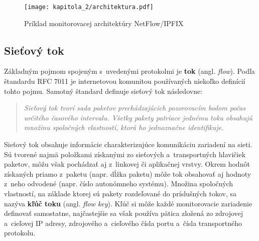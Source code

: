 \begin{figure*}[ht]
    \centering
    \texttt{[image: kapitola\_2/architektura.pdf]}
    \caption{Príklad monitorovacej architektúry NetFlow/IPFIX \cite{ipfix_architektura}}
    \label{architektura_ipfix}
\end{figure*}

\subsection*{Sieťový tok}
Základným pojmom spojeným s~uvedenými protokolmi je \textbf{tok} (angl. \textit{flow}). Podľa štandardu RFC 7011 \cite{rfc7011} je internetovou komunitou používaných niekoľko definícií tohto pojmu. Samotný štandard definuje sieťový tok následovne:

\begin{quote}
    \textit{Sieťový tok tvorí sada paketov prechádzajúcich pozorovacím bodom počas určitého časového intervalu. Všetky pakety patriace jednému toku obsahujú množinu spoločných vlastností, ktorá ho jednoznačne identifikuje.}
\end{quote}

Sieťový tok obsahuje informácie charakterizujúce komunikáciu zariadení na sieti. Sú tvorené najmä položkami získanými zo sieťových a~transportných hlavičiek paketov, môžu však pochádzať aj z~linkovej či aplikačnej vrstvy. Okrem hodnôt získaných priamo z~paketu
(napr. dĺžka paketu) môže tok obsahovať aj hodnoty z~neho odvodené (napr. číslo autonómneho systému). Množina spoločných vlastností, na základe ktorej sú pakety rozdeľované do príslušných tokov, sa nazýva \textbf{kľúč toku} (angl. \textit{flow key}).
Kľúč si môže každé monitorovacie zariadenie definovať samostatne, najčastejšie sa však používa pätica zložená zo zdrojovej a~cieľovej IP adresy, zdrojového a~cieľového čísla portu a~čísla transportného protokolu.

